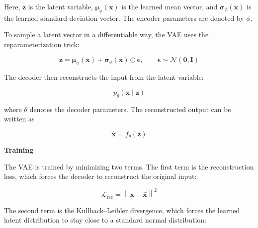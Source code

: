 \documentclass{book}
\providecommand{\ProjectDeepHeading}[2]{%
    \par\medskip\noindent\textbf{#2}\par\smallskip
}
\begin{document}
        Here, $\mathbf{z}$ is the latent variable, $\boldsymbol{\ensuremath{\mu}}_{\ensuremath{\phi}}(\mathbf{x})$ is the learned mean vector, and $\boldsymbol{\ensuremath{\sigma}}_{\ensuremath{\phi}}(\mathbf{x})$ is the learned standard deviation vector. The encoder parameters are denoted by $\ensuremath{\phi}$.
        
        To sample a latent vector in a differentiable way, the VAE uses the reparameterization trick:
        
        \begin{equation}
            \mathbf{z}
            =
            \boldsymbol{\ensuremath{\mu}}_{\ensuremath{\phi}}(\mathbf{x})
            +
            \boldsymbol{\ensuremath{\sigma}}_{\ensuremath{\phi}}(\mathbf{x})
            \odot
            \boldsymbol{\ensuremath{\epsilon}},
            \qquad
            \boldsymbol{\ensuremath{\epsilon}}
            \sim
            \mathcal{N}
            \left(
                \mathbf{0},
                \mathbf{I}
            \right)
        \end{equation}
        
        The decoder then reconstructs the input from the latent variable:
        
        \begin{equation}
            p_{\ensuremath{\theta}}(\mathbf{x} \mid \mathbf{z})
        \end{equation}
        
        where $\ensuremath{\theta}$ denotes the decoder parameters. The reconstructed output can be written as
        
        \begin{equation}
            \hat{\mathbf{x}}
            =
            f_{\ensuremath{\theta}}(\mathbf{z})
        \end{equation}
    
    
    \ProjectDeepHeading{5}{Training}
        The VAE is trained by minimizing two terms. The first term is the reconstruction loss, which forces the decoder to reconstruct the original input:
        
        \begin{equation}
            \mathcal{L}_{\mathrm{rec}}
            =
            \left\|
                \mathbf{x}
                -
                \hat{\mathbf{x}}
            \right\|^{2}
        \end{equation}
        
        The second term is the Kullback--Leibler divergence, which forces the learned latent distribution to stay close to a standard normal distribution:
        
\end{document}
